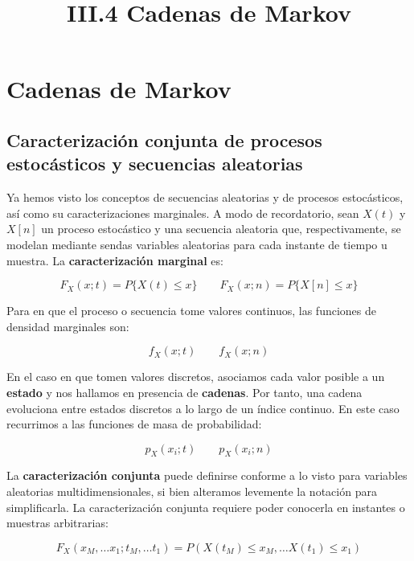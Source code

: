 \documentclass[11pt]{article}
\title{III.4 Cadenas de Markov}
\begin{document}
    
    
    \maketitle
    
    

    
    \hypertarget{cadenas-de-markov}{%
\section{Cadenas de Markov}\label{cadenas-de-markov}}

\hypertarget{caracterizaciuxf3n-conjunta-de-procesos-estocuxe1sticos-y-secuencias-aleatorias}{%
\subsection{Caracterización conjunta de procesos estocásticos y
secuencias
aleatorias}\label{caracterizaciuxf3n-conjunta-de-procesos-estocuxe1sticos-y-secuencias-aleatorias}}

Ya hemos visto los conceptos de secuencias aleatorias y de procesos
estocásticos, así como su caracterizaciones marginales. A modo de
recordatorio, sean \(X(t)\) y \(X[n]\) un proceso estocástico y una
secuencia aleatoria que, respectivamente, se modelan mediante sendas
variables aleatorias para cada instante de tiempo u muestra. La
\textbf{caracterización marginal} es:

\[F_X(x; t) = P\{X(t)\leq x\} \qquad F_X(x; n) = P\{X[n]\leq x\}\]

Para en que el proceso o secuencia tome valores continuos, las funciones
de densidad marginales son:

\[f_X(x; t) \qquad f_X(x; n)\]

En el caso en que tomen valores discretos, asociamos cada valor posible
a un \textbf{estado} y nos hallamos en presencia de \textbf{cadenas}.
Por tanto, una cadena evoluciona entre estados discretos a lo largo de
un índice continuo. En este caso recurrimos a las funciones de masa de
probabilidad:

\[p_X(x_i; t) \qquad p_X(x_i; n)\]

    La \textbf{caracterización conjunta} puede definirse conforme a lo visto
para variables aleatorias multidimensionales, si bien alteramos
levemente la notación para simplificarla. La caracterización conjunta
requiere poder conocerla en instantes o muestras arbitrarias:

\[
F_X(x_M ,\ldots x_1 ; t_M , \ldots t_1) = P(X(t_M)\leq x_M , \ldots X(t_1)\leq x_1)
\]
\end{document}
